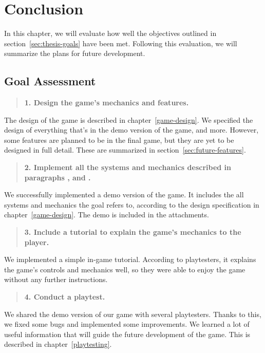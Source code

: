 \chapter{Conclusion}

In this chapter, we will evaluate how well the objectives outlined in section~\ref{sec:thesis-goals} have been met.
Following this evaluation, we will summarize the plans for future development.

\section{Goal Assessment}

\begin{quotation}
    \textbf{1. Design the game's mechanics and features.}
\end{quotation}

The design of the game is described in chapter~\ref{game-design}.
We specified the design of everything that's in the demo version of the game, and more.
However, some features are planned to be in the final game, but they are yet to be designed in full detail.
These are summarized in section~\ref{sec:future-features}.

\begin{quotation}
    \textbf{2. Implement all the systems and mechanics described in paragraphs ,  and .}
\end{quotation}

We successfully implemented a demo version of the game.
It includes the all systems and mechanics the goal refers to, according to the design specification in chapter~\ref{game-design}.
The demo is included in the attachments.

\begin{quotation}
    \textbf{3. Include a tutorial to explain the game's mechanics to the player.}
\end{quotation}

We implemented a simple in-game tutorial.
According to playtesters, it explains the game's controls and mechanics well, so they were able to enjoy the game without any further instructions.

\begin{quotation}
    \textbf{4. Conduct a playtest.}
\end{quotation}

We shared the demo version of our game with several playtesters.
Thanks to this, we fixed some bugs and implemented some improvements.
We learned a lot of useful information that will guide the future development of the game.
This is described in chapter~\ref{playtesting}.

